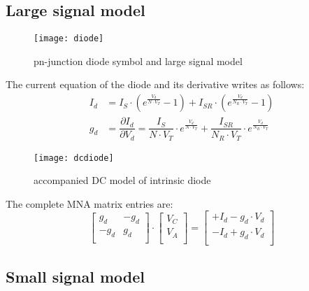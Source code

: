 \addvspace{12pt}

\subsection{Large signal model}

\begin{figure}[ht]
\begin{center}
\texttt{[image: diode]}
\end{center}
\caption{pn-junction diode symbol and large signal model}
\label{fig:diode}
\end{figure}
\FloatBarrier

The current equation of the diode and its derivative writes as
follows:
\begin{align}
I_{d} &= I_{S}\cdot \left(e^{\frac{V_{d}}{N\cdot V_{T}}} - 1\right) + I_{SR}\cdot \left(e^{\frac{V_{d}}{N_R\cdot V_{T}}} - 1\right)\\
g_{d} &= \dfrac{\partial I_{d}}{\partial V_{d}} = \dfrac{I_{S}}{N\cdot V_{T}}\cdot e^{\frac{V_{d}}{N\cdot V_{T}}} + \dfrac{I_{SR}}{N_R\cdot V_{T}}\cdot e^{\frac{V_{d}}{N_R\cdot V_{T}}}
\end{align}

\begin{figure}[ht]
\begin{center}
\texttt{[image: dcdiode]}
\end{center}
\caption{accompanied DC model of intrinsic diode}
\label{fig:dcdiode}
\end{figure}
\FloatBarrier

The complete MNA matrix entries are:
\begin{equation}
\begin{bmatrix}
g_{d} & -g_{d}\\
-g_{d} & g_{d}\\
\end{bmatrix}
\cdot
\begin{bmatrix}
V_{C}\\
V_{A}\\
\end{bmatrix}
=
\begin{bmatrix}
+I_{d} - g_{d}\cdot V_{d}\\
-I_{d} + g_{d}\cdot V_{d}\\
\end{bmatrix}
\end{equation}

\subsection{Small signal model}

